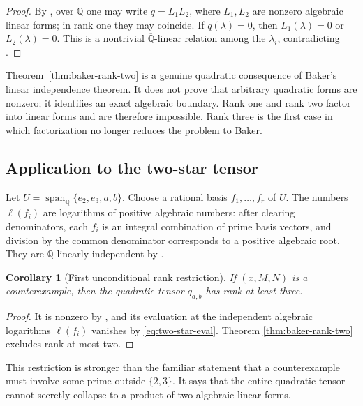 \documentclass[11pt]{article}
\newtheorem{corollary}[theorem]{Corollary}
\theoremstyle{definition}
\theoremstyle{remark}
\newcommand{\Q}{\mathbb{Q}}
\newcommand{\Qbar}{\overline{\mathbb{Q}}}
\newcommand{\Span}{\operatorname{span}}
\newcommand{\ellmap}{\boldsymbol{\ell}}
\begin{document}
\begin{proof}
By , over $\Qbar$ one may write $q=L_1L_2$, where $L_1,L_2$ are
nonzero algebraic linear forms; in rank one they may coincide.  If $q(\lambda)=0$, then
$L_1(\lambda)=0$ or $L_2(\lambda)=0$.  This is a nontrivial $\Qbar$-linear relation among
the $\lambda_i$, contradicting .
\end{proof}

\begin{resultbox}
Theorem~\ref{thm:baker-rank-two} is a genuine quadratic consequence of Baker's linear
independence theorem.  It does not prove that arbitrary quadratic forms are nonzero; it
identifies an exact algebraic boundary.  Rank one and rank two factor into linear forms and
are therefore impossible.  Rank three is the first case in which factorization no longer
reduces the problem to Baker.
\end{resultbox}

\subsection{Application to the two-star tensor}

Let $U=\Span_{\Q}\{e_2,e_3,a,b\}$.  Choose a rational basis
$f_1,\ldots,f_r$ of $U$.  The numbers $\ellmap(f_i)$ are logarithms of positive algebraic
numbers: after clearing denominators, each $f_i$ is an integral combination of prime basis
vectors, and division by the common denominator corresponds to a positive algebraic root.
They are $\Q$-linearly independent by .

\begin{corollary}[First unconditional rank restriction]
\label{cor:first-rank-restriction}
If $(x,M,N)$ is a counterexample, then the quadratic tensor $q_{a,b}$ has rank at least
three.
\end{corollary}

\begin{proof}
It is nonzero by , and its evaluation at the independent algebraic
logarithms $\ellmap(f_i)$ vanishes by \eqref{eq:two-star-eval}.  Theorem
\ref{thm:baker-rank-two} excludes rank at most two.
\end{proof}

This restriction is stronger than the familiar statement that a counterexample must involve
some prime outside $\{2,3\}$.  It says that the entire quadratic tensor cannot secretly
collapse to a product of two algebraic linear forms.
\end{document}
